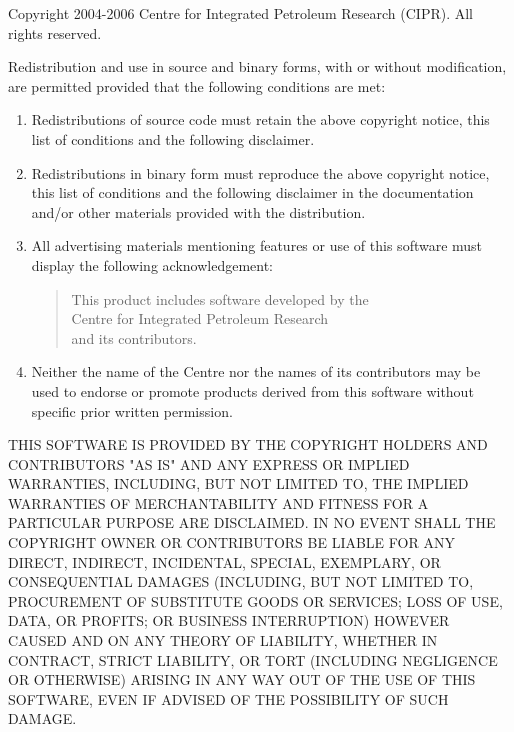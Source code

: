 
Copyright 2004-2006 Centre for Integrated Petroleum Research (CIPR).
All rights reserved.

Redistribution and use in source and binary forms, with or without
modification, are permitted provided that the following conditions are
met:
\begin{enumerate}

\item Redistributions of source code must retain the above copyright
  notice, this list of conditions and the following disclaimer.

\item Redistributions in binary form must reproduce the above
  copyright notice, this list of conditions and the following
  disclaimer in the documentation and/or other materials provided with
  the distribution.

\item All advertising materials mentioning features or use of this
  software must display the following acknowledgement:

  \begin{quote}
    This product includes software developed by the\\
    Centre for Integrated Petroleum Research\\
    and its contributors.
  \end{quote}

\item Neither the name of the Centre nor the names of its contributors
  may be used to endorse or promote products derived from this
  software without specific prior written permission.

\end{enumerate}

\begin{sloppypar}
  THIS SOFTWARE IS PROVIDED BY THE COPYRIGHT HOLDERS AND CONTRIBUTORS
  "AS IS" AND ANY EXPRESS OR IMPLIED WARRANTIES, INCLUDING, BUT NOT
  LIMITED TO, THE IMPLIED WARRANTIES OF MERCHANTABILITY AND FITNESS FOR
  A PARTICULAR PURPOSE ARE DISCLAIMED. IN NO EVENT SHALL THE COPYRIGHT
  OWNER OR CONTRIBUTORS BE LIABLE FOR ANY DIRECT, INDIRECT, INCIDENTAL,
  SPECIAL, EXEMPLARY, OR CONSEQUENTIAL DAMAGES (INCLUDING, BUT NOT
  LIMITED TO, PROCUREMENT OF SUBSTITUTE GOODS OR SERVICES; LOSS OF USE,
  DATA, OR PROFITS; OR BUSINESS INTERRUPTION) HOWEVER CAUSED AND ON ANY
  THEORY OF LIABILITY, WHETHER IN CONTRACT, STRICT LIABILITY, OR TORT
  (INCLUDING NEGLIGENCE OR OTHERWISE) ARISING IN ANY WAY OUT OF THE USE
  OF THIS SOFTWARE, EVEN IF ADVISED OF THE POSSIBILITY OF SUCH DAMAGE.
\end{sloppypar}

